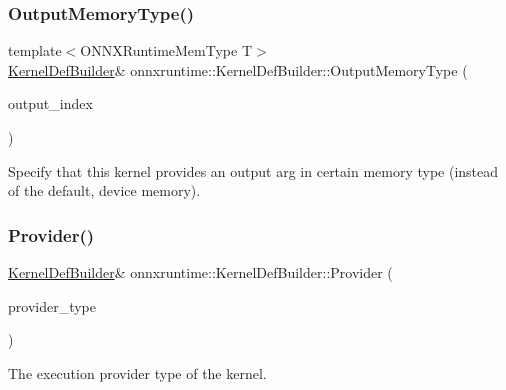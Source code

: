 \mbox{\label{classonnxruntime_1_1KernelDefBuilder_a07b8f5af0f2e23ea09c3f9c0b52dc227}} 
\subsubsection{\texorpdfstring{Output\+Memory\+Type()}{OutputMemoryType()}}
{\footnotesize\ttfamily template$<$O\+N\+N\+X\+Runtime\+Mem\+Type T$>$ \\
\mbox{\hyperlink{classonnxruntime_1_1KernelDefBuilder}{Kernel\+Def\+Builder}}\& onnxruntime\+::\+Kernel\+Def\+Builder\+::\+Output\+Memory\+Type (\begin{DoxyParamCaption}\item[{int}]{output\+\_\+index }\end{DoxyParamCaption})\hspace{0.3cm}{\ttfamily [inline]}}

Specify that this kernel provides an output arg in certain memory type (instead of the default, device memory). \mbox{\label{classonnxruntime_1_1KernelDefBuilder_a541928f5f11459f7356c76c981435dca}} 
\subsubsection{\texorpdfstring{Provider()}{Provider()}}
{\footnotesize\ttfamily \mbox{\hyperlink{classonnxruntime_1_1KernelDefBuilder}{Kernel\+Def\+Builder}}\& onnxruntime\+::\+Kernel\+Def\+Builder\+::\+Provider (\begin{DoxyParamCaption}\item[{\mbox{\hyperlink{namespaceonnxruntime_a863e2227cbf32aab76aad35fdadff4bb}{onnxruntime\+::\+Provider\+Type}}}]{provider\+\_\+type }\end{DoxyParamCaption})\hspace{0.3cm}{\ttfamily [inline]}}

The execution provider type of the kernel. \mbox{\label{classonnxruntime_1_1KernelDefBuilder_af21211cd18ea345bd116de8b22347676}} 
